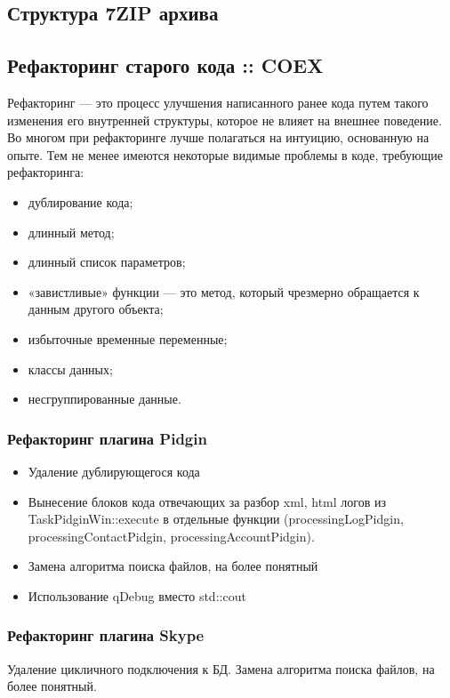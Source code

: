 \subsection{Структура 7ZIP архива}

\subsection{Рефакторинг старого кода :: COEX}
Рефакторинг — это процесс улучшения написанного ранее кода путем такого изменения его внутренней структуры, которое не влияет на внешнее поведение.
    Во многом при рефакторинге лучше полагаться на интуицию, основанную на опыте. Тем не менее имеются некоторые видимые проблемы в коде, требующие рефакторинга:
\begin{itemize}
\item дублирование кода;
\item длинный метод;
\item длинный список параметров;
\item «завистливые» функции — это метод, который чрезмерно обращается к данным другого объекта;
\item избыточные временные переменные;
\item классы данных;
\item несгруппированные данные.
\end{itemize}

\subsubsection{Рефакторинг плагина Pidgin}
\begin{itemize}
\item Удаление дублирующегося кода
\item Вынесение блоков кода отвечающих за разбор xml, html логов из TaskPidginWin::execute в отдельные функции (processingLogPidgin, processingContactPidgin, processingAccountPidgin).
\item Замена алгоритма поиска файлов, на более понятный
\item Использование qDebug вместо std::cout
\end{itemize}
\subsubsection{Рефакторинг плагина Skype}
Удаление цикличного подключения к БД.
Замена алгоритма поиска файлов, на более понятный.





